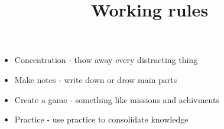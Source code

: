 \documentclass{article}
\title{Working rules}
\date{}
\begin{document}
\maketitle
\begin{itemize}
  \item Concentration - thow away every distracting thing
  \item Make notes - write down or drow main parts 
  \item Create a game - something like missions and achivments
  \item Practice - use practice to consolidate knowledge
\end{itemize}
\end{document}
